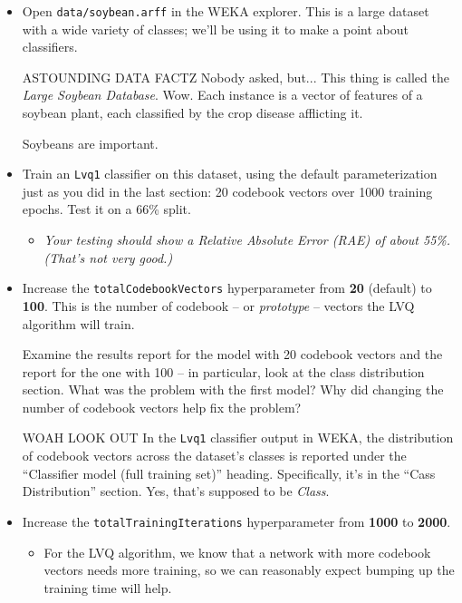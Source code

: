 \documentclass[11pt]{cselabheader}
\begin{document}
\begin{itemize}[leftmargin=*]
  \item Open \texttt{data/soybean.arff} in the WEKA explorer. This is a large dataset with a wide variety of classes; we'll be using it to make a point about classifiers.

  \begin{infobox}{ASTOUNDING DATA FACTZ}
    Nobody asked, but... This thing is called the \textit{Large Soybean Database}. Wow. Each instance is a vector of features of a soybean plant, each classified by the crop disease afflicting it.

    Soybeans are important.
  \end{infobox}

  \item Train an \texttt{Lvq1} classifier on this dataset, using the default parameterization just as you did in the last section: 20 codebook vectors over 1000 training epochs. Test it on a 66\% split.
  \begin{itemize}[leftmargin=*]
    \item \textit{Your testing should show a Relative Absolute Error (RAE) of about 55\%. (That's not very good.)}
  \end{itemize}
  
  \item Increase the \texttt{totalCodebookVectors} hyperparameter from \textbf{20} (default) to \textbf{100}. This is the number of codebook -- or \textit{prototype} -- vectors the LVQ algorithm will train.

  \begin{ex}
    Examine the results report for the model with 20 codebook vectors and the report for the one with 100 -- in particular, look at the class distribution section. What was the problem with the first model? Why did changing the number of codebook vectors help fix the problem?
  \end{ex}

  \begin{infobox}{WOAH LOOK OUT}
    In the \texttt{Lvq1} classifier output in WEKA, the distribution of codebook vectors across the dataset's classes is reported under the ``Classifier model (full training set)'' heading. Specifically, it's in the ``Cass Distribution'' section. Yes, that's supposed to be \textit{Class}.
  \end{infobox}

\pagebreak

  \item Increase the \texttt{totalTrainingIterations} hyperparameter from \textbf{1000} to \textbf{2000}.
  \begin{itemize}[leftmargin=*]
    \item For the LVQ algorithm, we know that a network with more codebook vectors needs more training, so we can reasonably expect bumping up the training time will help.
  \end{itemize}


\end{itemize}
\end{document}

